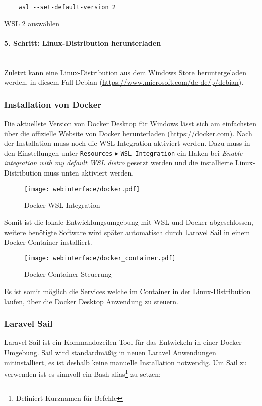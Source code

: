 \begin{listing}[H]
  \begin{verbatim}
    wsl --set-default-version 2
  \end{verbatim}
  \caption{WSL 2 auswählen}
\end{listing}

\paragraph{5. Schritt: Linux-Distribution herunterladen}\mbox{}\\
Zuletzt kann eine Linux-Distribution aus dem Windows Store heruntergeladen
werden, in diesem Fall Debian (\url{https://www.microsoft.com/de-de/p/debian}).

\subsubsection{Installation von Docker}
Die aktuellste Version von Docker Desktop für Windows lässt sich am einfachsten
über die offizielle Website von Docker herunterladen (\url{https://docker.com}).
Nach der Installation muss noch die WSL Integration aktiviert werden. Dazu muss
in den Einstellungen unter \verb|Resources| $\blacktriangleright$ \verb|WSL Integration|
ein Haken bei \textit{Enable integration with my default WSL distro}
gesetzt werden und die installierte Linux-Distribution muss unten aktiviert
werden.

\begin{figure}[H]
  \centering
  \texttt{[image: webinterface/docker.pdf]}
  \caption{Docker WSL Integration}
\end{figure}

Somit ist die lokale Entwicklungsumgebung mit WSL und Docker abgeschlossen,
weitere benötigte Software wird später automatisch durch Laravel Sail in einem Docker
Container installiert.

\begin{figure}[H]
  \centering
  \texttt{[image: webinterface/docker\_container.pdf]}
  \caption{Docker Container Steuerung}
\end{figure}

Es ist somit möglich die Services welche im Container in der Linux-Distribution
laufen, über die Docker Desktop Anwendung zu steuern.

\subsubsection{Laravel Sail}
Laravel Sail ist ein Kommandozeilen Tool für das Entwickeln in einer Docker
Umgebung. Sail wird standardmäßig in neuen Laravel Anwendungen mitinstalliert,
es ist deshalb keine manuelle Installation notwendig. Um Sail zu verwenden ist
es sinnvoll ein Bash alias\footnote{Definiert Kurznamen für Befehle} zu setzen:

